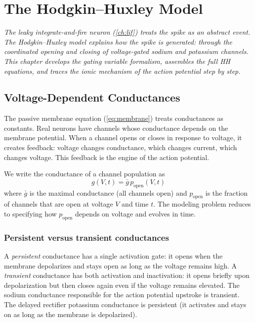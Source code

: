 \chapter{The Hodgkin--Huxley Model}
\label{ch:hodgkin-huxley}

\textit{The leaky integrate-and-fire neuron (\cref{ch:lif}) treats the spike as an abstract event. The Hodgkin--Huxley model explains \emph{how} the spike is generated: through the coordinated opening and closing of voltage-gated sodium and potassium channels. This chapter develops the gating variable formalism, assembles the full HH equations, and traces the ionic mechanism of the action potential step by step.}

\section{Voltage-Dependent Conductances}
\label{sec:voltage-conductances}

The passive membrane equation (\cref{eq:membrane}) treats conductances as constants. Real neurons have channels whose conductance depends on the membrane potential. When a channel opens or closes in response to voltage, it creates feedback: voltage changes conductance, which changes current, which changes voltage. This feedback is the engine of the action potential.

We write the conductance of a channel population as
%
\begin{equation}
  g(V, t) = \bar{g}\, p_{\text{open}}(V, t)
  \label{eq:conductance-gating}
\end{equation}
%
where $\bar{g}$ is the maximal conductance (all channels open) and $p_{\text{open}}$ is the fraction of channels that are open at voltage $V$ and time $t$. The modeling problem reduces to specifying how $p_{\text{open}}$ depends on voltage and evolves in time.

\subsection{Persistent versus transient conductances}

A \emph{persistent} conductance has a single activation gate: it opens when the membrane depolarizes and stays open as long as the voltage remains high. A \emph{transient} conductance has both activation and inactivation: it opens briefly upon depolarization but then closes again even if the voltage remains elevated. The sodium conductance responsible for the action potential upstroke is transient. The delayed rectifier potassium conductance is persistent (it activates and stays on as long as the membrane is depolarized).

